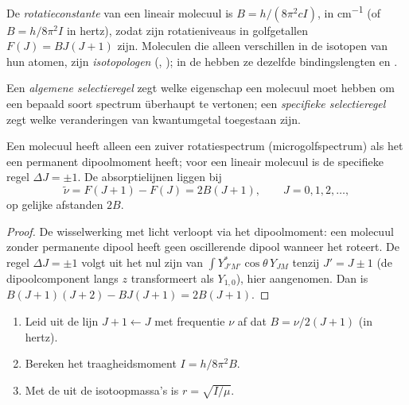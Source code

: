 \begin{definition}\label{def:b3:rovibrational-spectroscopy:rotational-constant}
De \emph{rotatieconstante} van een lineair molecuul
is $B = h/(8\pi^2cI)$, in \unit{cm^{-1}} (of $B = h/8\pi^2I$ in hertz), zodat zijn
rotatieniveaus in golfgetallen $F(J) = BJ(J+1)$ zijn. Moleculen die alleen
verschillen in de isotopen van hun atomen, zijn
\emph{isotopologen}
(, ); in de 
hebben ze dezelfde bindingslengten en .
\end{definition}

\begin{definition}\label{def:b3:rovibrational-spectroscopy:selection}
Een \emph{algemene selectieregel} zegt welke
eigenschap een molecuul moet hebben om een bepaald soort spectrum
überhaupt te vertonen; een
\emph{specifieke selectieregel} zegt welke
veranderingen van kwantumgetal toegestaan zijn.
\end{definition}

\begin{proposition}\label{prop:b3:rovibrational-spectroscopy:rotational-lines}
Een molecuul heeft alleen een zuiver rotatiespectrum (microgolfspectrum)
als het een permanent dipoolmoment heeft; voor een lineair molecuul is de
specifieke regel $\Delta J
= \pm1$. De absorptielijnen liggen bij
\[
\tilde\nu = F(J+1) - F(J) = 2B(J + 1), \qquad J = 0, 1, 2, \dots,
\]
op gelijke afstanden $2B$.
\end{proposition}

\begin{proof}
De wisselwerking met licht verloopt via het dipoolmoment: een molecuul
zonder permanente dipool heeft geen oscillerende dipool wanneer het
roteert. De regel $\Delta J
= \pm1$ volgt uit het nul zijn van $\int Y_{J'M'}^*\cos\theta\,Y_{JM}$ tenzij $J' = J
\pm 1$ (de dipoolcomponent langs $z$ transformeert als $Y_{1,0}$), hier
aangenomen.
Dan is $B(J+1)(J+2) - BJ(J+1) = 2B(J+1)$.
\end{proof}

\begin{method}\label{met:b3:rovibrational-spectroscopy:bond-length}
\begin{enumerate}
  \item Leid uit de lijn $J + 1 \leftarrow J$ met frequentie $\nu$ af dat $B =
        \nu/2(J+1)$ (in hertz).
  \item Bereken het traagheidsmoment $I = h/8\pi^2B$.
  \item Met de  uit de isotoopmassa's is $r = \sqrt{I/\mu}$.
\end{enumerate}
\end{method}

